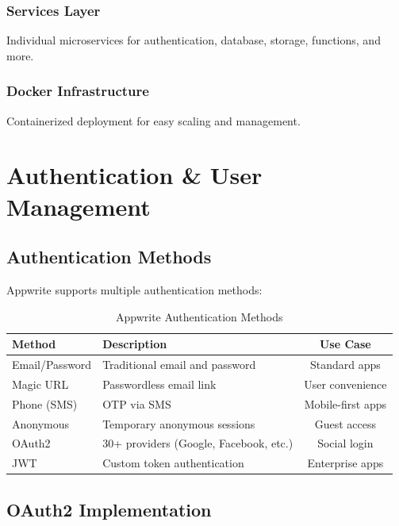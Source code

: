 \documentclass[11pt,a4paper,oneside]{book}
\begin{document}
\subsection{Services Layer}
Individual microservices for authentication, database, storage, functions, and more.

\subsection{Docker Infrastructure}
Containerized deployment for easy scaling and management.

\chapter{Authentication \& User Management}

\section{Authentication Methods}

Appwrite supports multiple authentication methods:

\begin{table}[h]
\centering
\begin{tabularx}{\textwidth}{l X c}
\toprule
\textbf{Method} & \textbf{Description} & \textbf{Use Case} \\
\midrule
Email/Password & Traditional email and password & Standard apps \\
Magic URL & Passwordless email link & User convenience \\
Phone (SMS) & OTP via SMS & Mobile-first apps \\
Anonymous & Temporary anonymous sessions & Guest access \\
OAuth2 & 30+ providers (Google, Facebook, etc.) & Social login \\
JWT & Custom token authentication & Enterprise apps \\
\bottomrule
\end{tabularx}
\caption{Appwrite Authentication Methods}
\end{table}

\section{OAuth2 Implementation}
\end{document}
